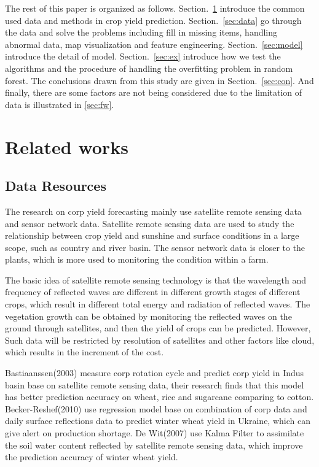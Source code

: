 \documentclass[conference]{IEEEtran}
\begin{document}
  The rest of this paper is organized as follows. Section.~\ref{sec:RW} introduce the common used data and methods in crop yield prediction. Section.~\ref{sec:data} go through the data and solve the problems including fill in missing items, handling abnormal data, map visualization and feature engineering. Section.~\ref{sec:model} introduce the detail of model. Section.~\ref{sec:ex} introduce how we test the algorithms and the procedure of handling the overfitting problem in random forest. The conclusions drawn from this study are given in Section.~\ref{sec:con}. And finally, there are some factors are not being considered due to the limitation of data is illustrated in \ref{sec:fw}.

\section{Related works} \label{sec:RW}

  \subsection{Data Resources}

    The research on corp yield forecasting mainly use satellite remote sensing data and sensor network data. Satellite remote sensing data are used to study the relationship between crop yield and sunshine and surface conditions in a large scope, such as country and river basin. The sensor network data is closer to the plants, which is more used to monitoring the condition within a farm. 

    The basic idea of satellite remote sensing technology is that the wavelength and frequency of reflected waves are different in different growth stages of different crops, which result in different total energy and radiation of reflected waves. The vegetation growth can be obtained by monitoring the reflected waves on the ground through satellites, and then the yield of crops can be predicted. However, Such data will be restricted by resolution of satellites and other factors like cloud, which results in the increment of the cost.

    Bastiaanssen(2003)\cite{Bastiaanssen2003} measure corp rotation cycle and predict corp yield in Indus basin base on satellite remote sensing data, their research finds that this model has better prediction accuracy on wheat, rice and sugarcane comparing to cotton. Becker-Reshef(2010)\cite{Becker-Reshef2010} use regression model base on  combination of  corp data and daily surface reflections data to predict winter wheat yield in Ukraine, which can give alert on production shortage. De Wit(2007)\cite{DeWit2007} use Kalma Filter to assimilate the soil water content reflected by satellite remote sensing data, which improve the prediction accuracy of winter wheat yield.
\end{document}
